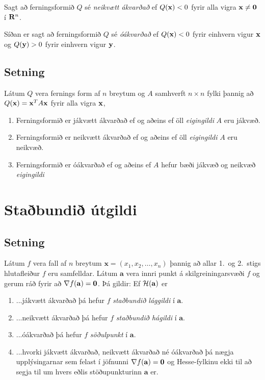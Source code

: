 \documentclass[a4paper,10pt,icelandic]{sphinxmanual}
\begin{document}
Sagt að ferningsformið \(Q\) sé \textit{neikvætt ákvarðað} ef \(Q(\mbox{${\bf x}$})<0\) fyrir alla vigra
\(\mbox{${\bf x}$}\neq \mbox{${\bf 0}$}\) í
\(\mbox{${\bf R}^n$}\).

Síðan er sagt að ferningsformið \(Q\) sé \textit{óákvarðað}
ef \(Q(\mbox{${\bf x}$})<0\) fyrir einhvern vigur
\(\mbox{${\bf x}$}\) og \(Q(\mbox{${\bf y}$})>0\) fyrir einhvern
vigur \(\mbox{${\bf y}$}\).


\subsection{Setning}
\label{Kafli3:id8}
Látum \(Q\) vera fernings form af \(n\) breytum og \(A\)
samhverft \(n\times n\) fylki þannig að
\(Q(\mbox{${\bf x}$})=\mbox{${\bf x}$}^TA\mbox{${\bf x}$}\) fyrir
alla vigra \(\mbox{${\bf x}$}\),
\begin{enumerate}
\item {} 
Ferningsformið er jákvætt ákvarðað ef og aðeins ef öll \textit{eigingildi}
\(A\) eru jákvæð.

\item {} 
Ferningsformið er neikvætt ákvarðað ef og aðeins ef öll \textit{eigingildi}
\(A\) eru neikvæð.

\item {} 
Ferningsformið er óákvarðað ef og aðeins ef \(A\) hefur bæði
jákvæð og neikvæð \textit{eigingildi}

\end{enumerate}


\section{Staðbundið útgildi}
\label{Kafli3:id9}

\subsection{Setning}
\label{Kafli3:id10}
Látum \(f\) vera fall af \(n\) breytum
\(\mathbf{x} = (x_1,x_2,\ldots,x_n)\) þannig að allar 1. og 2. stigs
hlutafleiður \(f\) eru samfelldar. Látum \(\mathbf{a}\) vera
innri punkt á skilgreiningarsvæði \(f\) og gerum ráð fyrir að
\(\nabla
f(\mathbf{a})=\mbox{${\bf 0}$}\). Þá gildir: Ef
\({\cal H}(\mathbf{a})\) er
\begin{enumerate}
\item {} 
...jákvætt ákvarðað þá hefur \(f\) \textit{staðbundið lággildi} í
\(\mathbf{a}\).

\item {} 
...neikvætt ákvarðað þá hefur \(f\) \textit{staðbundið hágildi} í
\(\mathbf{a}\).

\item {} 
...óákvarðað þá hefur \(f\) \textit{söðulpunkt} í \(\mathbf{a}\).

\item {} 
...hvorki jákvætt ákvarðað, neikvætt ákvarðað né óákvarðað þá nægja
upplýsingarnar sem felast í jöfnunni
\(\nabla f(\mathbf{a})=\mbox{${\bf 0}$}\) og Hesse-fylkinu ekki
til að segja til um hvers eðlis stöðupunkturinn \(\mathbf{a}\)
er.

\end{enumerate}
\end{document}
